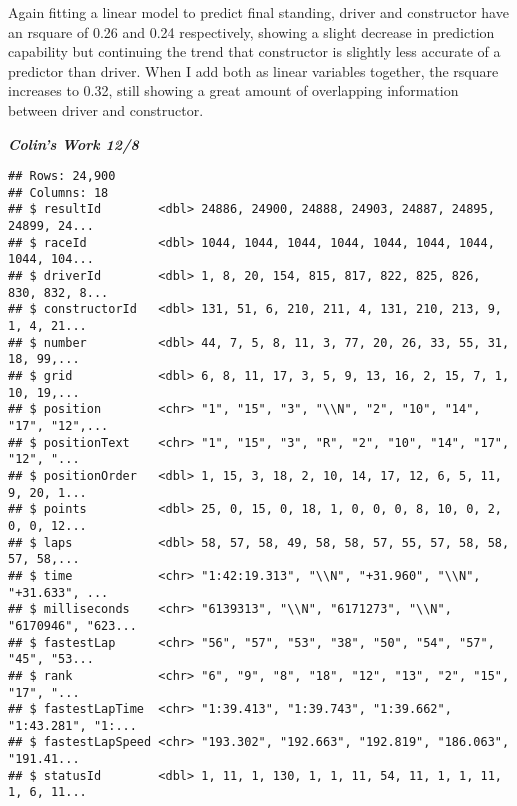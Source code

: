 \documentclass[
]{article}
\newenvironment{Shaded}{\begin{snugshade}}{\end{snugshade}}
\newcommand{\KeywordTok}[1]{\textcolor[rgb]{0.13,0.29,0.53}{\textbf{#1}}}
\newcommand{\NormalTok}[1]{#1}
\newcommand{\OperatorTok}[1]{\textcolor[rgb]{0.81,0.36,0.00}{\textbf{#1}}}
\newcommand{\StringTok}[1]{\textcolor[rgb]{0.31,0.60,0.02}{#1}}
\begin{document}
Again fitting a linear model to predict final standing, driver and
constructor have an rsquare of 0.26 and 0.24 respectively, showing a
slight decrease in prediction capability but continuing the trend that
constructor is slightly less accurate of a predictor than driver. When I
add both as linear variables together, the rsquare increases to 0.32,
still showing a great amount of overlapping information between driver
and constructor.

\textbf{\emph{Colin's Work 12/8}}

\begin{Shaded}
\end{Shaded}

\begin{verbatim}
## Rows: 24,900
## Columns: 18
## $ resultId        <dbl> 24886, 24900, 24888, 24903, 24887, 24895, 24899, 24...
## $ raceId          <dbl> 1044, 1044, 1044, 1044, 1044, 1044, 1044, 1044, 104...
## $ driverId        <dbl> 1, 8, 20, 154, 815, 817, 822, 825, 826, 830, 832, 8...
## $ constructorId   <dbl> 131, 51, 6, 210, 211, 4, 131, 210, 213, 9, 1, 4, 21...
## $ number          <dbl> 44, 7, 5, 8, 11, 3, 77, 20, 26, 33, 55, 31, 18, 99,...
## $ grid            <dbl> 6, 8, 11, 17, 3, 5, 9, 13, 16, 2, 15, 7, 1, 10, 19,...
## $ position        <chr> "1", "15", "3", "\\N", "2", "10", "14", "17", "12",...
## $ positionText    <chr> "1", "15", "3", "R", "2", "10", "14", "17", "12", "...
## $ positionOrder   <dbl> 1, 15, 3, 18, 2, 10, 14, 17, 12, 6, 5, 11, 9, 20, 1...
## $ points          <dbl> 25, 0, 15, 0, 18, 1, 0, 0, 0, 8, 10, 0, 2, 0, 0, 12...
## $ laps            <dbl> 58, 57, 58, 49, 58, 58, 57, 55, 57, 58, 58, 57, 58,...
## $ time            <chr> "1:42:19.313", "\\N", "+31.960", "\\N", "+31.633", ...
## $ milliseconds    <chr> "6139313", "\\N", "6171273", "\\N", "6170946", "623...
## $ fastestLap      <chr> "56", "57", "53", "38", "50", "54", "57", "45", "53...
## $ rank            <chr> "6", "9", "8", "18", "12", "13", "2", "15", "17", "...
## $ fastestLapTime  <chr> "1:39.413", "1:39.743", "1:39.662", "1:43.281", "1:...
## $ fastestLapSpeed <chr> "193.302", "192.663", "192.819", "186.063", "191.41...
## $ statusId        <dbl> 1, 11, 1, 130, 1, 1, 11, 54, 11, 1, 1, 11, 1, 6, 11...
\end{verbatim}
\end{document}
